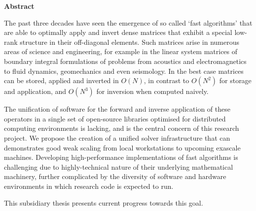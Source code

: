 \thispagestyle{plain}

\begin{center}
    \textbf{Abstract}
\end{center}

The past three decades have seen the emergence of so called `fast algorithms' that are able to optimally apply and invert dense matrices that exhibit a special low-rank structure in their off-diagonal elements. Such matrices arise in numerous areas of science and engineering, for example in the linear system matrices of boundary integral formulations of problems from acoustics and electromagnetics to fluid dynamics, geomechanics and even seismology. In the best case matrices can be stored, applied and inverted in $O(N)$, in contrast to $O(N^2)$ for storage and application, and $O(N^3)$ for inversion when computed naively.

The unification of software for the forward and inverse application of these operators in a single set of open-source libraries optimised for distributed computing environments is lacking, and is the central concern of this research project. We propose the creation of a unified solver infrastructure that can demonstrates good weak scaling from local workstations to upcoming exascale machines. Developing high-performance implementations of fast algorithms is challenging due to highly-technical nature of their underlying mathematical machinery, further complicated by the diversity of software and hardware environments in which research code is expected to run.

This subsidiary thesis presents current progress towards this goal. 

